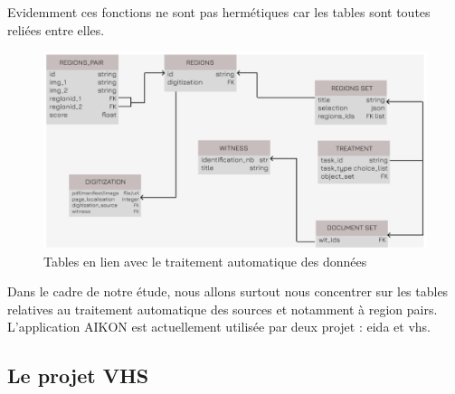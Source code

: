 Evidemment ces fonctions ne sont pas hermétiques car les tables sont toutes reliées entre elles.

\begin{figure}[H]
	\centering
	\includegraphics[width=1\textwidth]{images/tables_traitement_donnees.png}
	\caption{Tables en lien avec le traitement automatique des données}
	\label{fig:tables_traitement}
\end{figure}

Dans le cadre de notre étude, nous allons surtout nous concentrer sur les tables relatives au traitement automatique des sources et notamment à region pairs. \\

L'application AIKON est actuellement utilisée par deux projet : \gls{eida} et \gls{vhs}.

\subsection{Le projet VHS}

